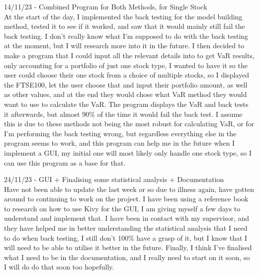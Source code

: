 \documentclass{article}
\begin{document}
14/11/23 - Combined Program for Both Methods, for Single Stock\\
At the start of the day, I implemented the back testing for the model building method, tested it to see if it worked, and saw that it would mainly still fail the back testing. I don't really know what I'm supposed to do with the back testing at the moment, but I will research more into it in the future. I then decided to make a program that I could input all the relevant details into to get VaR results, only accounting for a portfolio of just one stock type, I wanted to have it so the user could choose their one stock from a choice of multiple stocks, so I displayed the FTSE100, let the user choose that and input their portfolio amount, as well as other values, and at the end they would chose what VaR method they would want to use to calculate the VaR. The program displays the VaR and back tests it afterwards, but almost 90\% of the time it would fail the back test. I assume this is due to these methods not being the most robust for calculating VaR, or for I'm performing the back testing wrong, but regardless everything else in the program seems to work, and this program can help me in the future when I implement a GUI, my initial one will most likely only handle one stock type, so I can use this program as a base for that.\\\vspace{0.3cm}

24/11/23 - GUI + Finalising some statistical analysis + Documentation\\
Have not been able to update the last week or so due to illness again, have gotten around to continuing to work on the project. I have been using a reference book to research on how to use Kivy for the GUI, I am giving myself a few days to understand and implement that. I have been in contact with my supervisor, and they have helped me in better understanding the statistical analysis that I need to do when back testing, I still don't 100\% have a grasp of it, but I know that I will need to be able to utilise it better in the future. Finally, I think I've finalised what I need to be in the documentation, and I really need to start on it soon, so I will do do that soon too hopefully.\\\vspace{0.3cm}
\end{document}
